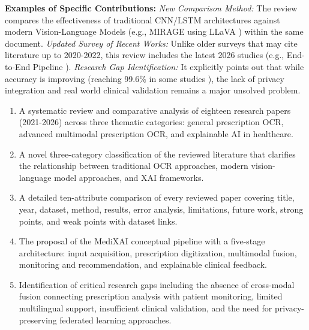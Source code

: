 \documentclass[conference]{IEEEtran}
\begin{document}
\textbf{Examples of Specific Contributions:}
\textit{New Comparison Method:} The review compares the effectiveness of traditional CNN/LSTM architectures against modern Vision-Language Models (e.g., MIRAGE using LLaVA \cite{priya2026medicalocr}) within the same document.
\textit{Updated Survey of Recent Works:} Unlike older surveys that may cite literature up to 2020-2022, this review includes the latest 2026 studies (e.g., End-to-End Pipeline \cite{srinivasa2020analysis}).
\textit{Research Gap Identification:} It explicitly points out that while accuracy is improving (reaching 99.6\% in some studies \cite{datta2025preserving}), the lack of privacy integration and real world clinical validation remains a major unsolved problem.

\begin{enumerate}[label=(\roman*)]
    \item A systematic review and comparative analysis of eighteen research papers (2021-2026) across three thematic categories: general prescription OCR, advanced multimodal prescription OCR, and explainable AI in healthcare.
    
    \item A novel three-category classification of the reviewed literature that clarifies the relationship between traditional OCR approaches, modern vision-language model approaches, and XAI frameworks.
    
    \item A detailed ten-attribute comparison of every reviewed paper covering title, year, dataset, method, results, error analysis, limitations, future work, strong points, and weak points with dataset links.
    
    \item The proposal of the MediXAI conceptual pipeline with a five-stage architecture: input acquisition, prescription digitization, multimodal fusion, monitoring and recommendation, and explainable clinical feedback.
    
    \item Identification of critical research gaps including the absence of cross-modal fusion connecting prescription analysis with patient monitoring, limited multilingual support, insufficient clinical validation, and the need for privacy-preserving federated learning approaches.
\end{enumerate}
\end{document}
